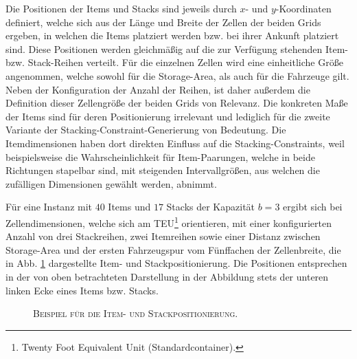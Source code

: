 Die Positionen der Items und Stacks sind jeweils durch $x$- und $y$-Koordinaten definiert,
welche sich aus der Länge und Breite der Zellen der beiden Grids ergeben, in welchen die Items platziert werden
bzw. bei ihrer Ankunft platziert sind. Diese Positionen werden gleichmäßig auf die zur Verfügung stehenden
Item- bzw. Stack-Reihen verteilt. Für die einzelnen Zellen wird eine einheitliche Größe angenommen,
welche sowohl für die Storage-Area, als auch für die Fahrzeuge gilt. Neben der Konfiguration der Anzahl der Reihen,
ist daher außerdem die Definition dieser Zellengröße der beiden Grids von Relevanz.
Die konkreten Maße der Items sind für deren Positionierung irrelevant und lediglich für
die zweite Variante der Stacking-Constraint-Generierung von Bedeutung.
Die Itemdimensionen haben dort direkten Einfluss auf die Stacking-Constraints,
weil beispielsweise die Wahrscheinlichkeit für Item-Paarungen, welche in beide Richtungen stapelbar sind,
mit steigenden Intervallgrößen, aus welchen die zufälligen Dimensionen gewählt werden, abnimmt.

\vfill
\pagebreak

Für eine Instanz mit $40$ Items und $17$ Stacks der Kapazität $b = 3$ ergibt sich bei
Zellendimensionen, welche sich am TEU\footnote{Twenty Foot Equivalent Unit (Standardcontainer).} orientieren,
mit einer konfigurierten Anzahl von drei Stackreihen,
zwei Itemreihen sowie einer Distanz zwischen Storage-Area und der ersten Fahrzeugspur vom Fünffachen
der Zellenbreite, die in Abb. \ref{fig:positioning_example} dargestellte Item- und Stackpositionierung.
Die Positionen entsprechen in der von oben betrachteten Darstellung in der Abbildung stets der unteren linken Ecke
eines Items bzw. Stacks.

\begin{figure}[H]
\centering
{}
\caption{\textsc{Beispiel für die Item- und Stackpositionierung.}}
\label{fig:positioning_example}
\end{figure}

